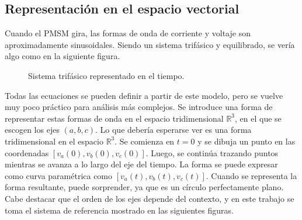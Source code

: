 \subsection{Representación en el espacio vectorial}

Cuando el PMSM gira, las formas de onda de corriente y voltaje son aproximadamente sinusoidales. Siendo un sistema trifásico y equilibrado, se vería algo como en la siguiente figura.

\begin{figure}[H]
    \centering
    \hspace*{-1.5cm}
    \caption{Sistema trifásico representado en el tiempo.}
\end{figure}

Todas las ecuaciones se pueden definir a partir de este modelo, pero se vuelve muy poco práctico para análisis más complejos. Se introduce una forma de representar estas formas de onda en el espacio tridimensional $\mathbb{R}^3$, en el que se escogen los ejes \((a, b, c)\). Lo que debería esperarse ver es una forma tridimensional en el espacio $\mathbb{R}^3$. Se comienza en \(t = 0\) y se dibuja un punto en las coordenadas \([v_a(0), v_b(0), v_c(0)]\). Luego, se continúa trazando puntos mientras se avanza a lo largo del eje del tiempo. La forma se puede expresar como curva paramétrica como \([v_a(t), v_b(t), v_c(t)]\). Cuando se representa la forma resultante, puede sorprender, ya que es un círculo perfectamente plano. Cabe destacar que el orden de los ejes depende del contexto, y en este trabajo se toma el sistema de referencia mostrado en las siguientes figuras.


